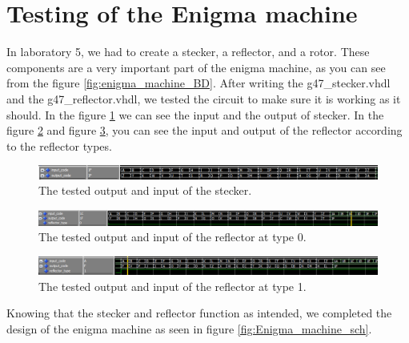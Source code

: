 \documentclass[10pt]{article}
\begin{document}
\section{Testing of the Enigma machine}
In laboratory 5, we had to create a stecker, a reflector, and a rotor. These components are a very important part of the enigma machine, as you can see from the figure \ref{fig:enigma_machine_BD}. After writing the g47\_stecker.vhdl and the g47\_reflector.vhdl, we tested the circuit to make sure it is working as it should. In the figure \ref{fig:stecker_test} we can see the input and the output of stecker. In the figure \ref{fig:refector_0_test} and figure \ref{fig:refector_1_test}, you can see the input and output of the reflector according to the reflector types.\\
\begin{figure}[!htb]
    \centering
    \includegraphics[width=1\textwidth]{./stecker_test.png}
    \caption{The tested output and input of the stecker.}
    \label{fig:stecker_test}
\end{figure}
\begin{figure}[!htb]
    \centering
    \includegraphics[width=1\textwidth]{./refector_0_test.png}
    \caption{The tested output and input of the reflector at type 0.}
    \label{fig:refector_0_test}
\end{figure}
\begin{figure}[!htb]
    \centering
    \includegraphics[width=1\textwidth]{./refector_1_test.png}
    \caption{The tested output and input of the reflector at type 1.}
    \label{fig:refector_1_test}
\end{figure}
\newpage
Knowing that the stecker and reflector function as intended, we completed the design of the enigma machine as seen in figure \ref{fig:Enigma_machine_sch}.\\
\end{document}
